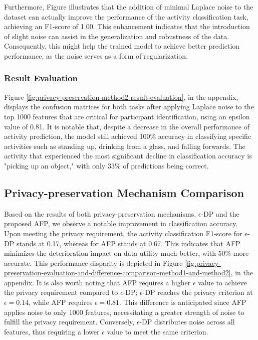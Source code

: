 \documentclass{l4proj}
\begin{document}
Furthermore, Figure  illustrates that the addition of minimal Laplace noise to the dataset can actually improve the performance of the activity classification task, achieving an F1-score of 1.00. This enhancement indicates that the introduction of slight noise can assist in the generalization and robustness of the data. Consequently, this might help the trained model to achieve better prediction performance, as the noise serves as a form of regularization.

\subsubsection{Result Evaluation}
Figure \ref{fig:privacy-preservation-method2-result-evaluation}, in the appendix, displays the confusion matrices for both tasks after applying Laplace noise to the top 1000 features that are critical for participant identification, using an epsilon value of 0.81. It is notable that, despite a decrease in the overall performance of activity prediction, the model still achieved 100\% accuracy in classifying specific activities such as standing up, drinking from a glass, and falling forwards. The activity that experienced the most significant decline in classification accuracy is "picking up an object," with only 33\% of predictions being correct.

\subsection{Privacy-preservation Mechanism Comparison}
Based on the results of both privacy-preservation mechanisms, $\epsilon$-DP and the proposed AFP, we observe a notable improvement in classification accuracy. Upon meeting the privacy requirement, the activity classification F1-score for $\epsilon$-DP stands at 0.17, whereas for AFP stands at 0.67. This indicates that AFP minimizes the deterioration impact on data utility much better, with 50\% more accurate. This performance disparity is depicted in Figure \ref{fig:privacy-preservation-evaluation-and-difference-comparison-method1-and-method2}, in the appendix. It is also worth noting that AFP requires a higher $\epsilon$ value to achieve the privacy requirement compared to $\epsilon$-DP; $\epsilon$-DP reaches the privacy criterion at $\epsilon=0.14$, while AFP requires $\epsilon=0.81$. This difference is anticipated since AFP applies noise to only 1000 features, necessitating a greater strength of noise to fulfill the privacy requirement. Conversely, $\epsilon$-DP distributes noise across all features, thus requiring a lower $\epsilon$ value to meet the same criterion.
\end{document}
